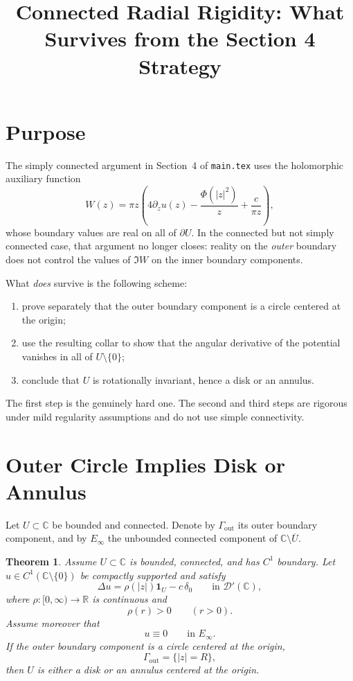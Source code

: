 \documentclass[11pt]{article}
\title{Connected Radial Rigidity: What Survives from the Section 4 Strategy}
\author{}
\date{}
\newtheorem{theorem}{Theorem}[section]
\newcommand{\C}{\mathbb C}
\newcommand{\R}{\mathbb R}
\newcommand{\1}{\mathbf 1}
\begin{document}
\maketitle

\section{Purpose}

The simply connected argument in Section~4 of \texttt{main.tex} uses the holomorphic
auxiliary function
\[
W(z)=\pi z\left(4\partial_z u(z)-\frac{\Phi(|z|^2)}{z}+\frac{c}{\pi z}\right),
\]
whose boundary values are real on all of $\partial U$. In the connected but not simply
connected case, that argument no longer closes: reality on the \emph{outer} boundary does not
control the values of $\Im W$ on the inner boundary components.

What \emph{does} survive is the following scheme:
\begin{enumerate}[label=\textnormal{(\arabic*)}]
\item prove separately that the outer boundary component is a circle centered at the origin;
\item use the resulting collar to show that the angular derivative of the potential vanishes in
all of $U\setminus\{0\}$;
\item conclude that $U$ is rotationally invariant, hence a disk or an annulus.
\end{enumerate}

The first step is the genuinely hard one. The second and third steps are rigorous under mild
regularity assumptions and do not use simple connectivity.

\section{Outer Circle Implies Disk or Annulus}

Let $U\subset \C$ be bounded and connected. Denote by $\Gamma_{\mathrm{out}}$ its outer
boundary component, and by $E_\infty$ the unbounded connected component of
$\C\setminus \overline U$.

\begin{theorem}\label{thm:outer-circle-implies-annulus}
Assume $U\subset \C$ is bounded, connected, and has $C^1$ boundary. Let
$u\in C^1(\C\setminus\{0\})$ be compactly supported and satisfy
\begin{equation}\label{eq:pde}
\Delta u=\rho(|z|)\1_U-c\,\delta_0
\qquad\text{in }\mathcal D'(\C),
\end{equation}
where $\rho:[0,\infty)\to \R$ is continuous and
\[
\rho(r)>0 \qquad (r>0).
\]
Assume moreover that
\[
u\equiv 0 \qquad\text{in }E_\infty.
\]
If the outer boundary component is a circle centered at the origin,
\[
\Gamma_{\mathrm{out}}=\{|z|=R\},
\]
then $U$ is either a disk or an annulus centered at the origin.
\end{theorem}
\end{document}
